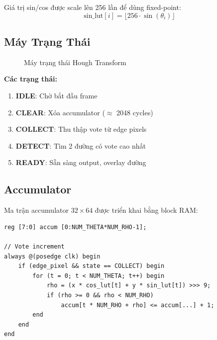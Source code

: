 \documentclass[12pt,a4paper]{report}
\begin{document}
Giá trị sin/cos được scale lên 256 lần để dùng fixed-point:
\begin{equation}
    \text{sin\_lut}[i] = \lfloor 256 \cdot \sin(\theta_i) \rfloor
\end{equation}

\subsection{Máy Trạng Thái}

\begin{figure}[h]
\centering
{}
\caption{Máy trạng thái Hough Transform}
\end{figure}

\textbf{Các trạng thái:}
\begin{enumerate}
    \item \textbf{IDLE}: Chờ bắt đầu frame
    \item \textbf{CLEAR}: Xóa accumulator ($\approx$ 2048 cycles)
    \item \textbf{COLLECT}: Thu thập vote từ edge pixels
    \item \textbf{DETECT}: Tìm 2 đường có vote cao nhất
    \item \textbf{READY}: Sẵn sàng output, overlay đường
\end{enumerate}

\subsection{Accumulator}
Ma trận accumulator $32 \times 64$ được triển khai bằng block RAM:
\begin{lstlisting}
reg [7:0] accum [0:NUM_THETA*NUM_RHO-1];

// Vote increment
always @(posedge clk) begin
    if (edge_pixel && state == COLLECT) begin
        for (t = 0; t < NUM_THETA; t++) begin
            rho = (x * cos_lut[t] + y * sin_lut[t]) >>> 9;
            if (rho >= 0 && rho < NUM_RHO)
                accum[t * NUM_RHO + rho] <= accum[...] + 1;
        end
    end
end
\end{lstlisting}
\end{document}
